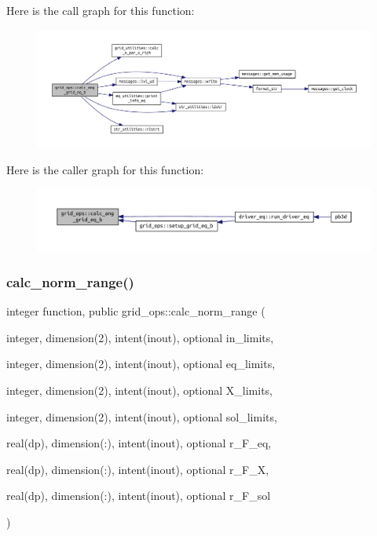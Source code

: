 Here is the call graph for this function\+:
\nopagebreak
\begin{figure}[H]
\begin{center}
\leavevmode
\includegraphics[width=350pt]{namespacegrid__ops_a06107dbdfd1dd62e372cc29ab0255bad_cgraph}
\end{center}
\end{figure}
Here is the caller graph for this function\+:
\nopagebreak
\begin{figure}[H]
\begin{center}
\leavevmode
\includegraphics[width=350pt]{namespacegrid__ops_a06107dbdfd1dd62e372cc29ab0255bad_icgraph}
\end{center}
\end{figure}
\mbox{\label{namespacegrid__ops_a596695cab6971ec6b9d32d13a50708b6}} 
\subsubsection{\texorpdfstring{calc\+\_\+norm\+\_\+range()}{calc\_norm\_range()}}
{\footnotesize\ttfamily integer function, public grid\+\_\+ops\+::calc\+\_\+norm\+\_\+range (\begin{DoxyParamCaption}\item[{integer, dimension(2), intent(inout), optional}]{in\+\_\+limits,  }\item[{integer, dimension(2), intent(inout), optional}]{eq\+\_\+limits,  }\item[{integer, dimension(2), intent(inout), optional}]{X\+\_\+limits,  }\item[{integer, dimension(2), intent(inout), optional}]{sol\+\_\+limits,  }\item[{real(dp), dimension(\+:), intent(inout), optional}]{r\+\_\+\+F\+\_\+eq,  }\item[{real(dp), dimension(\+:), intent(inout), optional}]{r\+\_\+\+F\+\_\+X,  }\item[{real(dp), dimension(\+:), intent(inout), optional}]{r\+\_\+\+F\+\_\+sol }\end{DoxyParamCaption})}




